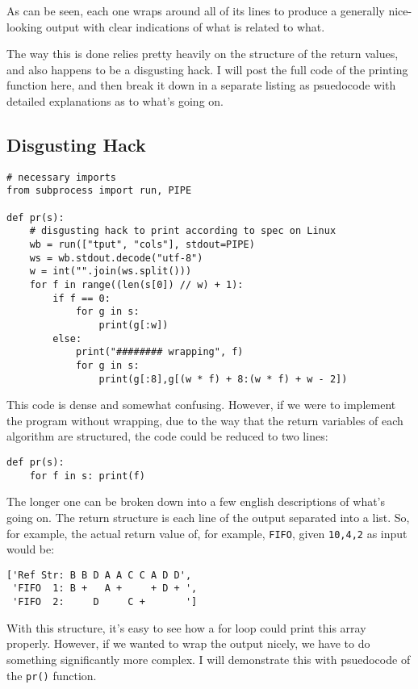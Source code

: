 \documentclass[11pt]{article}
\begin{document}
As can be seen, each one wraps around all of its lines to produce a generally nice-looking output with clear indications of what is related to what.

The way this is done relies pretty heavily on the structure of the return values, and also happens to be a disgusting hack.
I will post the full code of the printing function here, and then break it down in a separate listing as psuedocode with detailed explanations as to what's going on.

\subsection{Disgusting Hack}

\begin{lstlisting}
# necessary imports
from subprocess import run, PIPE

def pr(s):
	# disgusting hack to print according to spec on Linux
	wb = run(["tput", "cols"], stdout=PIPE)
	ws = wb.stdout.decode("utf-8")
	w = int("".join(ws.split()))
	for f in range((len(s[0]) // w) + 1):
		if f == 0:
			for g in s:
				print(g[:w])
		else:
			print("######## wrapping", f)
			for g in s:
				print(g[:8],g[(w * f) + 8:(w * f) + w - 2])
\end{lstlisting}

This code is dense and somewhat confusing.
However, if we were to implement the program without wrapping, due to the way that the return variables of each algorithm are structured, the code could be reduced to two lines:

\begin{lstlisting}
def pr(s):
	for f in s: print(f)
\end{lstlisting} 

The longer one can be broken down into a few english descriptions of what's going on.
The return structure is each line of the output separated into a list.
So, for example, the actual return value of, for example, \texttt{FIFO}, given \texttt{10,4,2} as input would be:

\begin{lstlisting}
['Ref Str: B B D A A C C A D D',
 'FIFO  1: B +   A +     + D + ',
 'FIFO  2:     D     C +       ']
\end{lstlisting}

With this structure, it's easy to see how a for loop could print this array properly.
However, if we wanted to wrap the output nicely, we have to do something significantly more complex.
I will demonstrate this with psuedocode of the \texttt{pr()} function.
\end{document}
